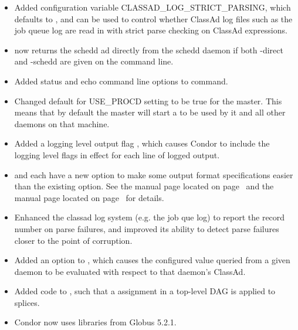\begin{itemize}

\item Added configuration variable CLASSAD\_LOG\_STRICT\_PARSING, which defaults to 
, and can be used to control whether ClassAd log files such as the job queue
log are read in with strict parse checking on ClassAd expressions.

\item {} now returns the schedd ad directly from the schedd daemon
if both -direct and -schedd are given on the command line.

\item Added status and echo command line options to  command.

\item Changed default for USE\_PROCD setting to be true for the master.  This means that by
default the master will start a  to be used by it and all other daemons on
that machine.

\item Added a  logging level output flag ,
which causes Condor to include the logging level
flags in effect for each line of logged output.

\item {} and  each have a new  option
to make some output format specifications easier than the existing
 option.
See the  manual page located on page~\pageref{man-condor-status}
and the  manual page located on page~\pageref{man-condor-q} 
for details.

\item Enhanced the classad log system (e.g. the job que log) to report the record number on parse failures, 
and improved its ability to detect parse failures closer to the point of corruption.

\item Added an  option to , which causes the configured value queried from
a given daemon to be evaluated with respect to that daemon's ClassAd.

\item Added code to ,
such that a  assignment in a top-level DAG is applied to splices.

\item Condor now uses libraries from Globus 5.2.1.


\end{itemize}
